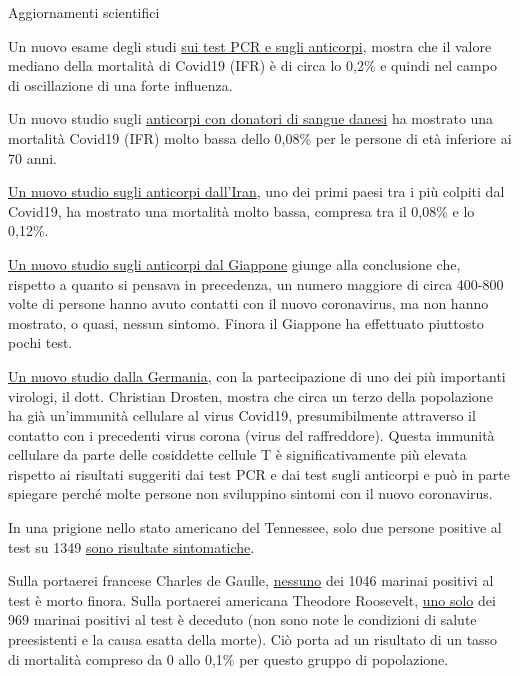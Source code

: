 Aggiornamenti scientifici

Un nuovo esame degli studi
\href{https://swprs.org/studies-on-covid-19-lethality/}{sui test PCR e
sugli anticorpi}, mostra che il valore mediano della mortalità di
Covid19 (IFR) è di circa lo 0,2\% e quindi nel campo di oscillazione di
una forte influenza.

Un nuovo studio sugli
\href{https://www.medrxiv.org/content/10.1101/2020.04.24.20075291v1}{anticorpi
con donatori di sangue danesi} ha mostrato una mortalità Covid19 (IFR)
molto bassa dello 0,08\% per le persone di età inferiore ai 70 anni.

\href{https://www.medrxiv.org/content/10.1101/2020.04.26.20079244v1}{Un
nuovo studio sugli anticorpi dall'Iran}, uno dei primi paesi tra i più
colpiti dal Covid19, ha mostrato una mortalità molto bassa, compresa tra
il 0,08\% e lo 0,12\%.

\href{https://www.medrxiv.org/content/10.1101/2020.04.26.20079822v1}{Un
nuovo studio sugli anticorpi dal Giappone} giunge alla conclusione che,
rispetto a quanto si pensava in precedenza, un numero maggiore di circa
400-800 volte di persone hanno avuto contatti con il nuovo coronavirus,
ma non hanno mostrato, o quasi, nessun sintomo. Finora il Giappone ha
effettuato piuttosto pochi test.

\href{https://www.medrxiv.org/content/10.1101/2020.04.17.20061440v1}{Un
nuovo studio dalla Germania}, con la partecipazione di uno dei più
importanti virologi, il dott. Christian Drosten, mostra che circa un
terzo della popolazione ha già un'immunità cellulare al virus Covid19,
presumibilmente attraverso il contatto con i precedenti virus corona
(virus del raffreddore). Questa immunità cellulare da parte delle
cosiddette cellule T è significativamente più elevata rispetto ai
risultati suggeriti dai test PCR e dai test sugli anticorpi e può in
parte spiegare perché molte persone non sviluppino sintomi con il nuovo
coronavirus.

In una prigione nello stato americano del Tennessee, solo due persone
positive al test su 1349
\href{https://www.tennessean.com/story/news/politics/2020/05/01/tennessee-testing-all-inmates-prison-staff-after-multiple-outbreaks/3067388001/}{sono
risultate sintomatiche}.

Sulla portaerei francese Charles de Gaulle,
\href{https://en.wikipedia.org/wiki/COVID-19_pandemic_on_Charles_de_Gaulle}{nessuno}
dei 1046 marinai positivi al test è morto finora. Sulla portaerei
americana Theodore Roosevelt,
\href{https://en.wikipedia.org/wiki/COVID-19_pandemic_on_USS_Theodore_Roosevelt}{uno
solo} dei 969 marinai positivi al test è deceduto (non sono note le
condizioni di salute preesistenti e la causa esatta della morte). Ciò
porta ad un risultato di un tasso di mortalità compreso da 0 allo 0,1\%
per questo gruppo di popolazione.

